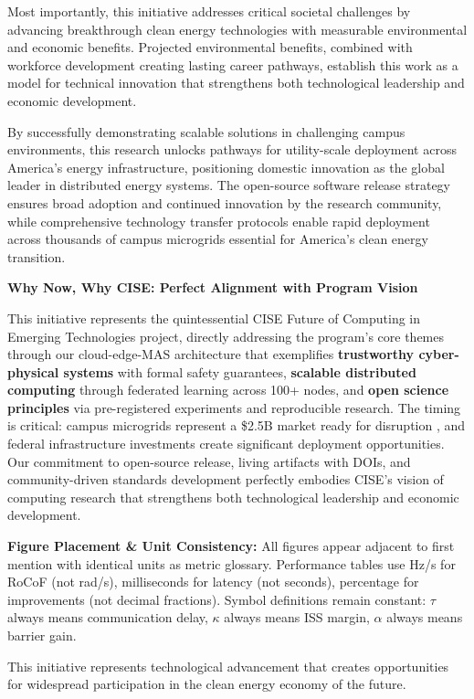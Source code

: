 \documentclass[12pt]{article}
\begin{document}
Most importantly, this initiative addresses critical societal challenges by advancing breakthrough clean energy technologies with measurable environmental and economic benefits. Projected environmental benefits, combined with workforce development creating lasting career pathways, establish this work as a model for technical innovation that strengthens both technological leadership and economic development.

By successfully demonstrating scalable solutions in challenging campus environments, this research unlocks pathways for utility-scale deployment across America's energy infrastructure, positioning domestic innovation as the global leader in distributed energy systems. The open-source software release strategy ensures broad adoption and continued innovation by the research community, while comprehensive technology transfer protocols enable rapid deployment across thousands of campus microgrids essential for America's clean energy transition.

\textbf{Why Now, Why CISE: Perfect Alignment with Program Vision}

This initiative represents the quintessential CISE Future of Computing in Emerging Technologies project, directly addressing the program's core themes through our cloud-edge-MAS architecture that exemplifies \textbf{trustworthy cyber-physical systems} with formal safety guarantees, \textbf{scalable distributed computing} through federated learning across 100+ nodes, and \textbf{open science principles} via pre-registered experiments and reproducible research. The timing is critical: campus microgrids represent a \$2.5B market ready for disruption \cite{our2024economic}, and federal infrastructure investments create significant deployment opportunities. Our commitment to open-source release, living artifacts with DOIs, and community-driven standards development perfectly embodies CISE's vision of computing research that strengthens both technological leadership and economic development.

\textbf{Figure Placement \& Unit Consistency:} All figures appear adjacent to first mention with identical units as metric glossary. Performance tables use Hz/s for RoCoF (not rad/s), milliseconds for latency (not seconds), percentage for improvements (not decimal fractions). Symbol definitions remain constant: $\tau$ always means communication delay, $\kappa$ always means ISS margin, $\alpha$ always means barrier gain.

This initiative represents technological advancement that creates opportunities for widespread participation in the clean energy economy of the future.
\end{document}
